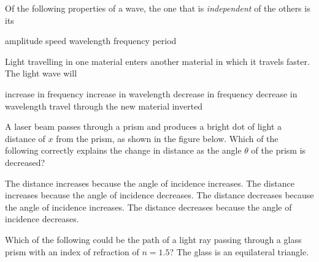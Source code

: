 \documentclass{../../ossphysics}
\begin{document}

\begin{questions}

  \question Of the following properties of a wave, the one that is
  \emph{independent} of the others is its \underline{\hspace{1in}}
  \begin{choices}
    \choice amplitude
    \choice speed
    \choice wavelength
    \choice frequency
    \choice period
  \end{choices}
  
  \question Light travelling in one material enters another material in which it
  travels faster. The light wave will \underline{\hspace{.5in}}
  \begin{choices}
    \choice increase in frequency
    \choice increase in wavelength
    \choice decrease in frequency
    \choice decrease in wavelength
    \choice travel through the new material inverted
  \end{choices}

  \question A laser beam passes through a prism and produces a bright dot of
  light a distance of $x$ from the prism, as shown in the figure below. Which
  of the following correctly explains the change in distance as the angle
  $\theta$ of the prism is decreased?
  \begin{center}
  \end{center}
  \begin{choices}
    \choice The distance increases because the angle of incidence increases.
    \choice The distance increases because the angle of incidence decreases.
    \choice The distance decreases because the angle of incidence increases.
    \choice The distance decreases because the angle of incidence decreases.
  \end{choices}
  
  \question Which of the following could be the path of a light ray passing
  through a glass prism with an index of refraction of $n=1.5$? The glass is an
  equilateral triangle. %
  

\end{questions}
\end{document}

